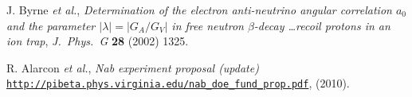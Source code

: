 \documentclass{PoS}
\newcommand{\etal}{\textsl{et al.}}
\begin{document}
\begin{thebibliography}{99}
 J. Byrne \etal, 
  \emph{Determination of the electron anti-neutrino angular correlation
    $a_0$ and the parameter $|\lambda| = |G_A/G_V|$ in free neutron
    $\beta$-decay  \ldots recoil protons in an ion trap}, 
   \emph{J.\ Phys.\ G} \textbf{28} (2002) 1325.

 R. Alarcon \etal, \emph{Nab experiment proposal (update)}
  {\href{http://nab.phys.virginia.edu/nab_doe_fund_prop.pdf}{
         \texttt{http://pibeta.phys.virginia.edu/nab\_doe\_fund\_prop.pdf}}},
  (2010).

\end{thebibliography}
\end{document}
